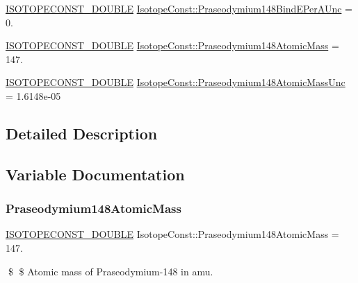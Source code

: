 \begin{DoxyCompactItemize}
\item 
\mbox{\hyperlink{group___isotope_const-_macros_ga8f45a7272ce02c0b4c65c44636ed719a}{I\+S\+O\+T\+O\+P\+E\+C\+O\+N\+S\+T\+\_\+\+D\+O\+U\+B\+LE}} \mbox{\hyperlink{group___isotope_const-_praseodymium-_pr148_gaaf68b930c6646469e24789621d6533af}{Isotope\+Const\+::\+Praseodymium148\+Bind\+E\+Per\+A\+Unc}} = 0.
\item 
\mbox{\hyperlink{group___isotope_const-_macros_ga8f45a7272ce02c0b4c65c44636ed719a}{I\+S\+O\+T\+O\+P\+E\+C\+O\+N\+S\+T\+\_\+\+D\+O\+U\+B\+LE}} \mbox{\hyperlink{group___isotope_const-_praseodymium-_pr148_ga2be6e21c07c32861c7bd766a9d86dd8c}{Isotope\+Const\+::\+Praseodymium148\+Atomic\+Mass}} = 147.
\item 
\mbox{\hyperlink{group___isotope_const-_macros_ga8f45a7272ce02c0b4c65c44636ed719a}{I\+S\+O\+T\+O\+P\+E\+C\+O\+N\+S\+T\+\_\+\+D\+O\+U\+B\+LE}} \mbox{\hyperlink{group___isotope_const-_praseodymium-_pr148_ga41337798af08568419c1255630760d70}{Isotope\+Const\+::\+Praseodymium148\+Atomic\+Mass\+Unc}} = 1.\+6148e-\/05
\end{DoxyCompactItemize}


\subsection{Detailed Description}


\subsection{Variable Documentation}
\mbox{\label{group___isotope_const-_praseodymium-_pr148_ga2be6e21c07c32861c7bd766a9d86dd8c}} 
\subsubsection{\texorpdfstring{Praseodymium148\+Atomic\+Mass}{Praseodymium148AtomicMass}}
{\footnotesize\ttfamily \mbox{\hyperlink{group___isotope_const-_macros_ga8f45a7272ce02c0b4c65c44636ed719a}{I\+S\+O\+T\+O\+P\+E\+C\+O\+N\+S\+T\+\_\+\+D\+O\+U\+B\+LE}} Isotope\+Const\+::\+Praseodymium148\+Atomic\+Mass = 147.}

\$ \$ Atomic mass of Praseodymium-\/148 in amu. \mbox{\label{group___isotope_const-_praseodymium-_pr148_ga41337798af08568419c1255630760d70}} 
